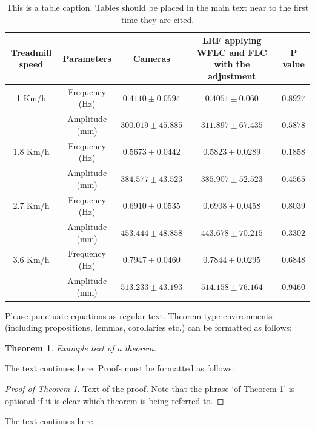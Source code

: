 \documentclass[journal,article,submit,moreauthors,pdftex,10pt,a4paper]{mdpi}
\theoremstyle{mdpi}
\newcounter{thm}
\newcounter{ex}
\newcounter{re}
\newtheorem{Theorem}[thm]{Theorem}
\theoremstyle{mdpidefinition}
\begin{document}
\begin{table}[H]
\caption{This is a table caption. Tables should be placed in the main text near to the first time they are cited.}
\small %
\centering
\begin{tabular}{ccccc}
\toprule
\textbf{Treadmill speed}	& \textbf{Parameters}	& \textbf{Cameras}	& \textbf{LRF applying WFLC and  FLC with the adjustment}  & \textbf{P value}\\
\midrule
1 Km/h		& Frequency	(Hz)	& $0.4110 \pm 0.0594$	& $0.4051 \pm 0.060$	& $0.8927$\\
			& Amplitude	(mm)	& $300.019 \pm 45.885$	& $311.897 \pm 67.435$	& $0.5878$\\
1.8 Km/h	& Frequency	(Hz)	& $0.5673 \pm 0.0442$ 	& $0.5823 \pm 0.0289$	& $0.1858$\\
			& Amplitude	(mm)	& $384.577 \pm 43.523$	& $385.907 \pm 52.523$	& $0.4565$\\
2.7 Km/h	& Frequency	(Hz)	& $0.6910 \pm 0.0535$	& $0.6908 \pm 0.0458$	& $0.8039$\\
			& Amplitude	(mm)	& $453.444 \pm 48.858$	& $443.678 \pm 70.215$	& $0.3302$\\
3.6 Km/h	& Frequency	(Hz)	& $0.7947 \pm 0.0460$ 	& $0.7844 \pm 0.0295$ 	& $0.6848$\\
			& Amplitude	(mm)	& $513.233 \pm 43.193$	& $514.158 \pm 76.164$	& $0.9460$\\
\bottomrule
\end{tabular}
\end{table}



Please punctuate equations as regular text. Theorem-type environments (including propositions, lemmas, corollaries etc.) can be formatted as follows:
\begin{Theorem}
Example text of a theorem.
\end{Theorem}
The text continues here. Proofs must be formatted as follows:

\begin{proof}[Proof of Theorem 1]
Text of the proof. Note that the phrase `of Theorem 1' is optional if it is clear which theorem is being referred to.
\end{proof}
The text continues here.
\end{document}
